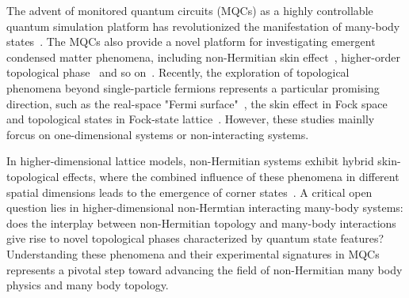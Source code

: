 \documentclass[longbibliography, aps, prx, amsmath, amssymb, amsfonts, twocolumn,superscriptaddress, footinbib]{revtex4-1}
\begin{document}
	The advent of monitored quantum circuits (MQCs) as a highly controllable quantum simulation platform has revolutionized the manifestation of many-body states~\cite{skinner2019measurement,nahum2017quantum,gullans2020dynamical,koh2023measurement,li2023cross,choi2020quantum,minato2022fate,yang2025bridging,potter2022entanglement,iqbal2024non}. 
	The MQCs also provide a novel platform for investigating emergent condensed matter phenomena, including non-Hermitian skin effect~\cite{fleckenstein2022non}, higher-order topological phase~\cite{koh2024realization} and so on~\cite{iqbal2024non}. Recently, the exploration of topological phenomena beyond single-particle fermions represents a particular promising direction, such as the real-space "Fermi surface"~\cite{shen2025observation}, the skin effect in Fock space~\cite{shen2024enhanced,shimomura2024general} and  topological states in Fock-state lattice~\cite{deng2022observing}. However, these studies mainlly forcus on one-dimensional systems or non-interacting systems. 

	In higher-dimensional lattice models, non-Hermitian systems exhibit hybrid skin-topological effects, where the combined influence of these phenomena in different spatial dimensions leads to the emergence of corner states~\cite{lee2019hybrid,zou2021observation,RN1221}.
	A critical open question lies in higher-dimensional non-Hermtian interacting many-body systems: does the interplay between non-Hermitian topology and many-body interactions give rise to novel topological phases characterized by quantum state features? 
	Understanding these phenomena and their experimental signatures in MQCs represents a pivotal step toward advancing the field of non-Hermitian many body physics and many body topology. 
\end{document}
